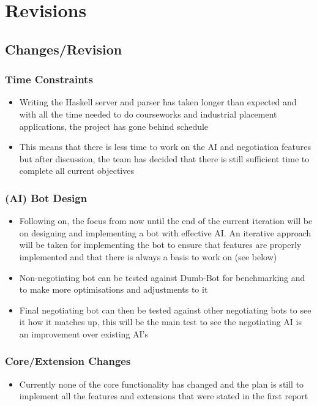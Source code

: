 \documentclass[12pt]{article}
\begin{document}
\section{Revisions}


\subsection{Changes/Revision}


\subsubsection{Time Constraints}
\begin{itemize}
\item Writing the Haskell server and parser has taken longer than expected
and with all the time needed to do courseworks and industrial placement
applications, the project has gone behind schedule
\item This means that there is less time to work on the AI and negotiation
features but after discussion, the team has decided that there is
still sufficient time to complete all current objectives
\end{itemize}

\subsubsection{(AI) Bot Design }
\begin{itemize}
\item Following on, the focus from now until the end of the current iteration
will be on designing and implementing a bot with effective AI. An
iterative approach will be taken for implementing the bot to ensure
that features are properly implemented and that there is always a
basis to work on (see below)
\item Non-negotiating bot can be tested against Dumb-Bot for benchmarking
and to make more optimisations and adjustments to it
\item Final negotiating bot can then be tested against other negotiating
bots to see it how it matches up, this will be the main test to see
the negotiating AI is an improvement over existing AI's
\end{itemize}

\subsubsection{Core/Extension Changes}
\begin{itemize}
\item Currently none of the core functionality has changed and the plan
is still to implement all the features and extensions that were stated
in the first report
\end{itemize}
\end{document}
